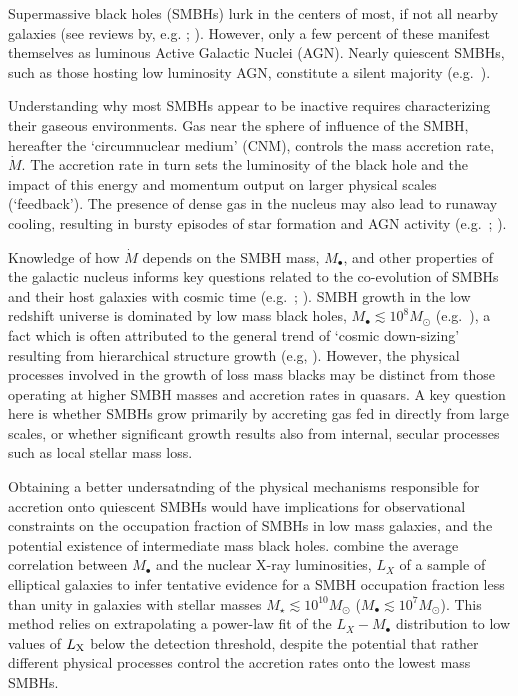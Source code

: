 \documentclass[usenatbib,fleqn]{mn2e}
\newcommand{\Mbh}[1][]{M_{\bullet#1}}
\begin{document}
Supermassive black holes (SMBHs) lurk in the centers of most, if not
all nearby galaxies (see reviews by,
e.g. \citealt{KormendyRichstone:1995a};
\citealt{FerrareseFord:2005a}). However, only a few percent of these
manifest themselves as luminous Active Galactic Nuclei (AGN).  Nearly
quiescent SMBHs, such as those hosting low luminosity AGN, constitute
a silent majority (e.g.~\citealt{Ho:2009a}).

Understanding why most SMBHs appear to be inactive requires characterizing their gaseous environments.  Gas near the sphere of influence of the SMBH, hereafter the `circumnuclear medium' (CNM), controls the mass accretion rate, $\dot{M}$.  The accretion rate in turn sets the luminosity of the black hole and the impact of this energy and momentum output on larger physical scales (`feedback').  The presence of dense gas in the nucleus may also lead to runaway cooling, resulting in bursty episodes of star formation and AGN activity (e.g.~\citealt{Ciotti&Ostriker07}; \citealt{Ciotti+10}).

Knowledge of how $\dot{M}$ depends on the SMBH mass, $\Mbh$, and other properties of the
galactic nucleus informs key questions related to the co-evolution of SMBHs and their host galaxies with cosmic time (e.g.~\citealt{Kormendy&Ho13}; \citealt{Heckman&Best14}).  SMBH growth in the low redshift universe is dominated by low mass black holes, $M_{\bullet} \lesssim 10^{8}M_{\odot}$ (e.g.~\citealt{Heckman+04}), a fact which is often attributed to the general trend of `cosmic down-sizing' resulting from hierarchical structure growth (e.g, \citealt{Gallo+08}).  However, the physical processes involved in the growth of loss mass blacks may be distinct from those operating at higher SMBH masses and accretion rates in quasars.  A key question here is whether SMBHs grow primarily by accreting gas fed in directly from large scales, or whether significant growth results also from internal, secular processes such as local stellar mass loss.

Obtaining a better undersatnding of the physical mechanisms responsible for accretion onto quiescent SMBHs would have implications for observational constraints on the occupation fraction of SMBHs in low mass galaxies, and the potential existence of intermediate mass black holes.  \citet{Miller+15} combine the average correlation between $\Mbh$ and the nuclear X-ray luminosities, $L_{X}$ of a sample of elliptical galaxies to infer tentative evidence for a SMBH occupation fraction less than unity in galaxies with stellar masses $M_{\star} \lesssim 10^{10}M_{\odot}$ ($M_{\bullet} \lesssim 10^{7}M_{\odot}$).  This method relies on extrapolating a power-law fit of the $L_X-\Mbh$ distribution to low values of $L_{\rm X}$ below the detection threshold, despite the potential that rather different physical processes control the accretion rates onto the lowest mass SMBHs.
\end{document}
